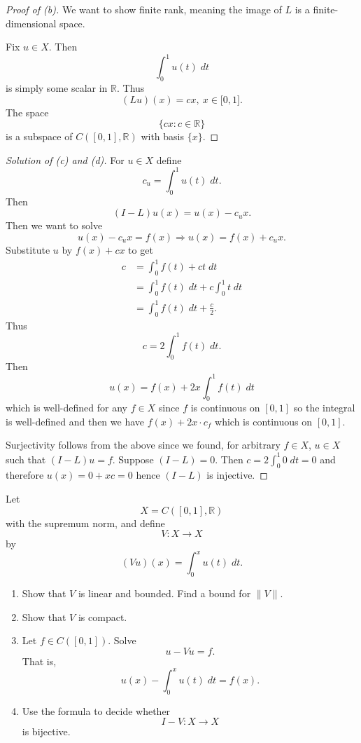 \begin{proof}[Proof of (b)]
    We want to show finite rank, meaning the image of $L$ 
    is a finite-dimensional space. 

    Fix $u \in X$. Then 
    \[
        \int_0^1 u(t) \; dt
    \]
    is simply some scalar in $\mathbb R$. Thus 
    \[        
        (Lu)(x) = cx, \ x \in \mathbb [0,1]. 
    \]
    The space 
    \[
        \{cx : c \in \mathbb R\}
    \]
    is a subspace of $C([0,1],\mathbb R)$ with basis 
    $\{x\}$. 
\end{proof}
\begin{proof}[Solution of (c) and (d)]
    For $u \in X$ define
    \[
        c_u = \int_0^1 u(t)\; dt. 
    \]
    Then 
    \[
        (I-L)u(x) = u(x) - c_ux.  
    \]
    Then we want to solve 
    \[
        u(x) - c_ux = f(x) \Rightarrow u(x) = f(x) + c_ux.
    \]
    Substitute $u$ by $f(x) + cx$ to get 
    \begin{align*}
        c 
        &= \int_0^1 f(t) + ct \; dt \\  
        &= \int_0^1 f(t) \; dt + c \int_0^1 t \; dt \\ 
        &= \int_0^1 f(t) \; dt + \frac{c}{2}.
    \end{align*}
    Thus 
    \[
        c = 2\int_0^1 f(t) \; dt. 
    \]
    Then 
    \[
        u(x) = f(x) + 2x \int_0^1 f(t) \; dt 
    \]
    which is well-defined for any $f \in X$ since $f$ is continuous
    on $[0,1]$ so the integral is well-defined and then we have 
    $f(x) + 2x \cdot c_f$ which is continuous on $[0,1]$. 

    Surjectivity follows from the above since we found, for arbitrary 
    $f \in X$, $u \in X$ such that $(I-L)u = f$. 
    Suppose $(I-L) = 0$. Then $c = 2 \int_0^1 0 \; dt = 0$ and 
    therefore $u(x) = 0 + xc = 0$ hence $(I-L)$ is injective. 
\end{proof}

\begin{prob}
    Let 
    \[
        X = C([0,1],\mathbb R)
    \]
    with the supremum norm, and define 
    \[
        V : X \to X
    \]
    by 
    \[
        (Vu)(x) = \int_0^x u(t) \; dt. 
    \]

    \begin{enumerate}[label=\alph*)]
        \item Show that $V$ is linear and bounded. Find a bound for $\|V\|$. 
        \item Show that $V$ is compact. 
        \item Let $f \in C([0,1]).$ Solve 
            \[
                u - Vu = f. 
            \]
            That is, 
            \[
                u(x) - \int_0^x u(t) \; dt = f(x). 
            \]
        \item Use the formula to decide whether 
            \[
                I - V : X \to X
            \]
            is bijective. 
    \end{enumerate}
\end{prob}

